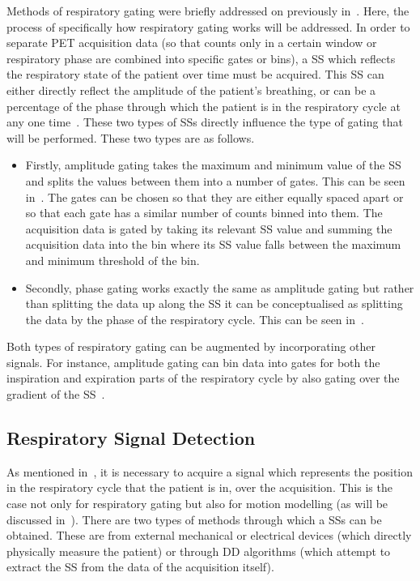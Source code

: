             Methods of respiratory gating were briefly addressed on previously in~. Here, the process of specifically how respiratory gating works will be addressed. In order to separate \gls{PET} acquisition data (so that counts only in a certain window or respiratory phase are combined into specific gates or bins), a \gls{SS} which reflects the respiratory state of the patient over time must be acquired. This \gls{SS} can either directly reflect the amplitude of the patient's breathing, or can be a percentage of the phase through which the patient is in the respiratory cycle at any one time~\parencite{Kitamura2017TheMethods.}. These two types of \glspl{SS} directly influence the type of gating that will be performed. These two types are as follows.
            
            \begin{itemize}
                \item Firstly, amplitude gating takes the maximum and minimum value of the \gls{SS} and splits the values between them into a number of gates. This can be seen in~. The gates can be chosen so that they are either equally spaced apart or so that each gate has a similar number of counts binned into them. The acquisition data is gated by taking its relevant \gls{SS} value and summing the acquisition data into the bin where its \gls{SS} value falls between the maximum and minimum threshold of the bin.
                
                \item Secondly, phase gating works exactly the same as amplitude gating but rather than splitting the data up along the \gls{SS} it can be conceptualised as splitting the data by the phase of the respiratory cycle. This can be seen in~.
            \end{itemize}
            
            Both types of respiratory gating can be augmented by incorporating other signals. For instance, amplitude gating can bin data into gates for both the inspiration and expiration parts of the respiratory cycle by also gating over the gradient of the \gls{SS}~\parencite{Low2005}.
        
        \subsection{Respiratory Signal Detection} \label{sec:respiratory_signal_detection}
            As mentioned in~, it is necessary to acquire a signal which represents the position in the respiratory cycle that the patient is in, over the acquisition. This is the case not only for respiratory gating but also for motion modelling (as will be discussed in~). There are two types of methods through which a \glspl{SS} can be obtained. These are from external mechanical or electrical devices (which directly physically measure the patient) or through \gls{DD} algorithms (which attempt to extract the \gls{SS} from the data of the acquisition itself).
            
